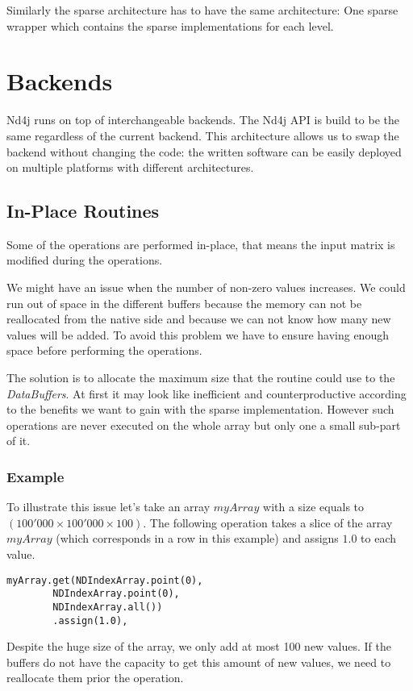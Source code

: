  Similarly the sparse architecture has to have the same architecture: One sparse wrapper which contains the sparse implementations for each level.
 
\section{Backends}

Nd4j runs on top of interchangeable backends. The Nd4j API is build to be the same regardless of the current backend. This architecture allows us to swap the backend without changing the code: the written software can be easily deployed on multiple platforms with different architectures.

\subsection{In-Place Routines}
Some of the operations are performed in-place, that means the input matrix is modified during the operations.

We might have an issue when the number of non-zero values increases. We could run out of space in the different buffers because the memory can not be reallocated from the native side and because we can not know how many new values will be added. To avoid this problem we have to ensure having enough space before performing the operations.

The solution is to allocate the maximum size that the routine could use to the \textit{DataBuffers}. At first it may look like inefficient and counterproductive according to the benefits we want to gain with the sparse implementation. However such operations are never executed on the whole array but only one a small sub-part of it.

\subsubsection{Example}
To illustrate this issue let's take an array $myArray$ with a size equals to $(100'000\times 100'000 \times 100)$. 
The following operation takes a slice of the array $myArray$ (which corresponds in a row in this example) and assigns $1.0$ to each value. 
\begin{lstlisting}[style=nonumbers]
	myArray.get(NDIndexArray.point(0), 
		NDIndexArray.point(0), 
		NDIndexArray.all())
		.assign(1.0),
\end{lstlisting}
Despite the huge size of the array, we only add at most 100 new values. If the buffers do not have the capacity to get this amount of new values, we need to reallocate them prior the operation.


